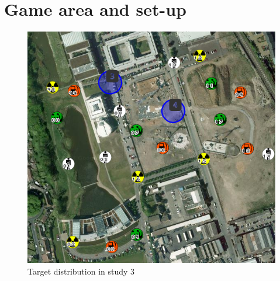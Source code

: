 \section{Game area and set-up}\label{app:area3}
\begin{figure}[H]
  \centering
  \includegraphics[width=1\textwidth]{img/Appendix/targets2}
  \caption{Target distribution in study 3}
\end{figure}


